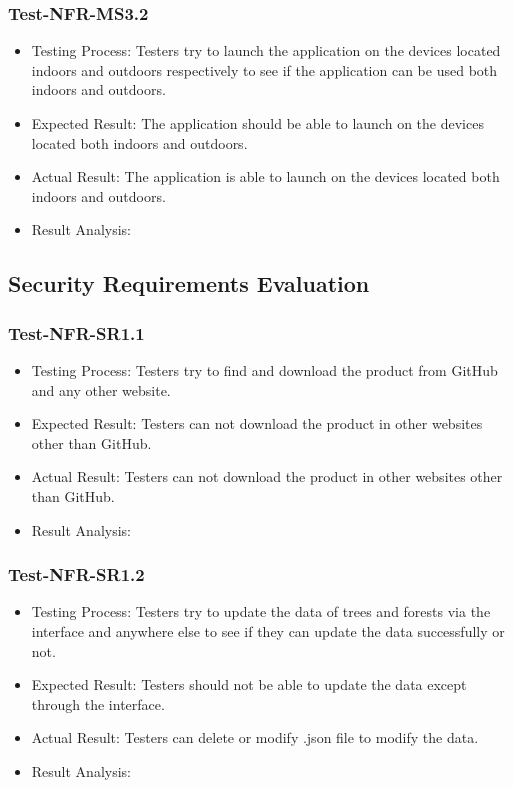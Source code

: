 \documentclass[12pt, titlepage]{article}
\begin{document}
\subsubsection{Test-NFR-MS3.2}
\begin{itemize}
    \item Testing Process: Testers try to launch the application on the devices located
indoors and outdoors respectively to see if the application can be used both indoors and
outdoors.
    \item Expected Result: The application should be able to launch on the devices located both indoors and outdoors.
    \item Actual Result: The application is able to launch on the devices located both indoors and outdoors.
    \item Result Analysis: \pass
\end{itemize}




\subsection{Security Requirements Evaluation}
\subsubsection{Test-NFR-SR1.1}
\begin{itemize}
    \item Testing Process:  Testers try to find and download the product from GitHub and
any other website.
    \item Expected Result: Testers can not download the product in other websites other than GitHub.
    \item Actual Result: Testers can not download the product in other websites other than GitHub.
    \item Result Analysis: \pass
\end{itemize}

\subsubsection{Test-NFR-SR1.2}
\begin{itemize}
    \item Testing Process:  Testers try to update the data of trees and forests via the interface and anywhere else to see if they can update the data successfully or not.
    \item Expected Result: Testers should not be able to update the data except through the interface. 
    \item Actual Result: Testers can delete or modify .json file to modify the data.
    \item Result Analysis: \fail
\end{itemize}
\end{document}
